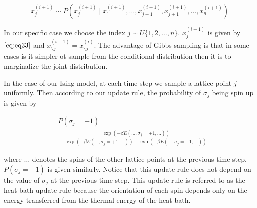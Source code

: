 \documentclass{article}
\begin{document}
\begin{equation} \label{eq:eq33}
    x_j^{(i+1)} \sim P(x_j^{(i+1)} \mid x_1^{(i+1)}, \ldots, x_{j-1}^{(i+1)}, x_{j+1}^{(i+1)}, \ldots, x_{n}^{(i+1)})
\end{equation}

In our specific case we choose the index $j \sim U\{1,2,\ldots, n\}$. $x_j^{(i+1)}$ is given by $\ref{eq:eq33}$ and 
$x_{\backslash j}^{(i+1)} = x_{\backslash j}^{(i)}$. The advantage of Gibbs sampling is that in some cases is it simpler ot sample from the conditional
distribution then it is to marginalize the joint distribution.

In the case of our Ising model, at each time step we sample a lattice point $j$ uniformly. Then according to our update rule, 
the probability of $\sigma_j$ being spin up is given by 

\begin{equation}
    \begin{split}
    &P(\sigma_j = +1) = \\
    &\quad \frac{\exp(-\beta E(\ldots, \sigma_j = +1, \ldots))}{\exp(-\beta E(\ldots, \sigma_j = +1, \ldots)) + \exp(-\beta E(\ldots, \sigma_j = -1, \ldots))}
    \end{split}
\end{equation}

where $\ldots$ denotes the spins of the other lattice points at the previous time step. $P(\sigma_j = -1)$ is given similarly. 
Notice that this update rule does not depend on the value of $\sigma_j$ at the previous time step. This update rule
is referred to as the heat bath update rule because the orientation of each spin depends only on the energy transferred from the thermal energy of the heat bath.
\end{document}
